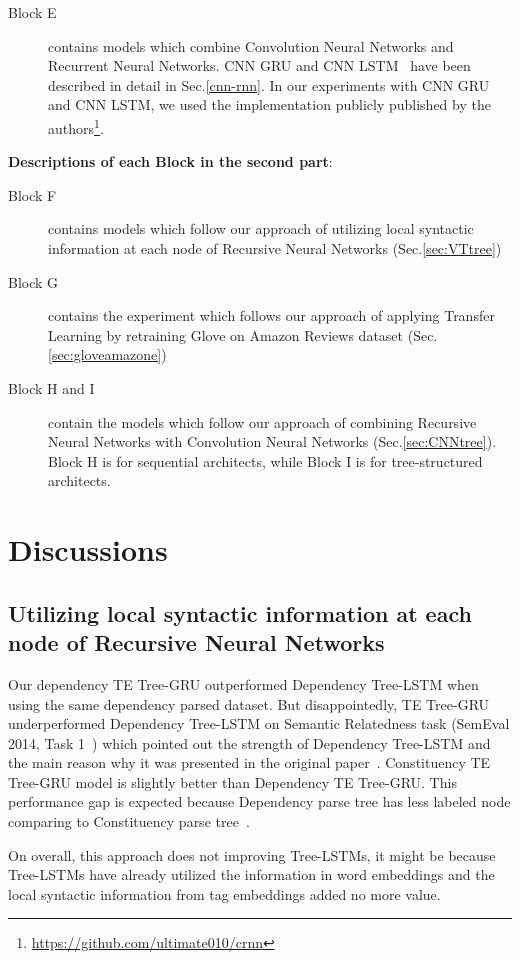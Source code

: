 \begin{description}
\item[Block E] contains models which combine Convolution Neural Networks and Recurrent Neural Networks.
CNN GRU and CNN LSTM~\cite{cnn-rnn} have been described in detail in Sec.\ref{cnn-rnn}.
In our experiments with CNN GRU and CNN LSTM, we used the implementation publicly published by the authors\footnote{\url{https://github.com/ultimate010/crnn}}.
\end{description}

\textbf{Descriptions of each Block in the second part}:
\begin{description}
\item[Block F] contains models which follow our approach of utilizing local syntactic information at each node of Recursive Neural Networks (Sec.\ref{sec:VTtree})
\item[Block G] contains the experiment which follows our approach of applying Transfer Learning by retraining Glove on Amazon Reviews dataset (Sec.\ref{sec:gloveamazone})
\item[Block H and I] contain the models which follow our approach of combining Recursive Neural Networks with Convolution Neural Networks (Sec.\ref{sec:CNNtree}).
Block H is for sequential architects, while Block I is for tree-structured architects.
\end{description}
\section{Discussions}
\subsection{Utilizing local syntactic information at each node of Recursive Neural Networks}
Our dependency TE Tree-GRU outperformed Dependency Tree-LSTM when using the same dependency parsed dataset.
But disappointedly, TE Tree-GRU underperformed Dependency Tree-LSTM on Semantic Relatedness task (SemEval 2014, Task 1~\cite{SemeEvalTask1}) which pointed out the strength of Dependency Tree-LSTM and the main reason why it was presented in the original paper~\cite{treeLSTM}.
Constituency TE Tree-GRU model is slightly better than Dependency TE Tree-GRU.
This performance gap is expected because Dependency parse tree has less labeled node comparing to Constituency parse tree~\cite{treeLSTM}.

\label{unproved:tag-useless}
On overall, this approach does not improving Tree-LSTMs, it might be because Tree-LSTMs have already utilized the information in word embeddings and the local syntactic information from tag embeddings added no more value.


